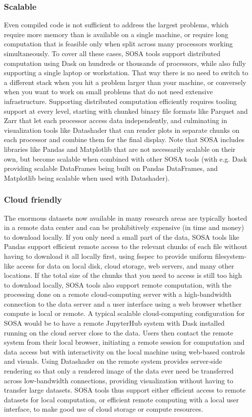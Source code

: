 \subsubsection{Scalable}
Even compiled code is not sufficient to address the largest problems, which require more memory than is available on a single machine, or require long computation that is feasible only when split across many processors working simultaneously. To cover all these cases, SOSA tools support distributed computation using Dask \cite{dask} on hundreds or thousands of processors, while also fully supporting a single laptop or workstation. That way there is no need to switch to a different stack when you hit a problem larger than your machine, or conversely when you want to work on small problems that do not need extensive infrastructure. Supporting distributed computation efficiently requires tooling support at every level, starting with chunked binary file formats like Parquet and Zarr that let each processor access data independently, and culminating in visualization tools like Datashader that can render plots in separate chunks on each processor and combine them for the final display. Note that SOSA includes libraries like Pandas and Matplotlib that are not necessarily scalable on their own, but become scalable when combined with other SOSA tools (with e.g. Dask providing scalable DataFrames being built on Pandas DataFrames, and Matplotlib being scalable when used with Datashader).

\subsubsection{Cloud friendly}
The enormous datasets now available in many research areas are typically hosted in a remote data center and can be prohibitively expensive (in time and money) to download locally. If you only need a small part of the data, SOSA tools like Pandas support efficient remote access to the relevant chunks of each file without having to download it all locally first, using fsspec to provide uniform filesystem-like access for data on local disk, cloud storage, web servers, and many other locations. If the total size of the chunks that you need to access is still too high to download locally, SOSA tools also support remote computation, with the processing done on a remote cloud-computing server with a high-bandwidth connection to the data server and a user interface using a web browser whether compute is local or remote.  A typical scalable cloud-computing configuration for SOSA would be to have a remote JupyterHub system with Dask installed running on the cloud server close to the data. Users then contact the remote system from their local browser, initiating a remote session for computation and data access but with interactivity on the local machine using web-based controls and visuals. Using Datashader on the remote system provides server-side rendering so that only a rendered image of the data ever need be transferred across low-bandwidth connections, providing visualization without having to transfer large datasets. SOSA tools thus support either efficient access to remote datasets for local computation, or efficient remote computing with a local user interface, to make good use of cloud storage or compute resources.

